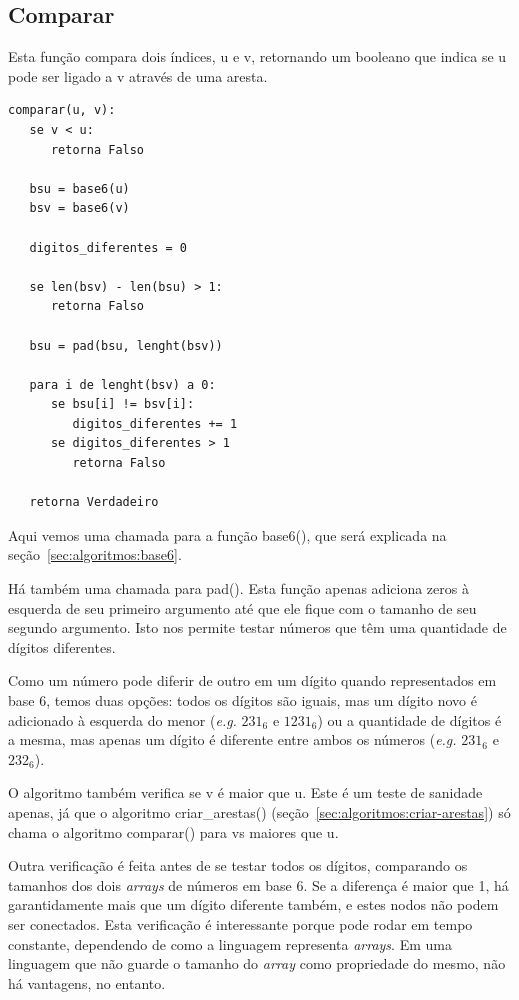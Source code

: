 \documentclass[12pt]{article}
\begin{document}
\subsection{Comparar}\label{sec:algoritmos:comparar}
Esta fun\c{c}ão compara dois índices, {\sf u} e {\sf v}, retornando um booleano que indica se {\sf u} pode ser ligado a {\sf v} através de uma aresta.
\begin{lstlisting}
comparar(u, v):
   se v < u:
      retorna Falso

   bsu = base6(u)
   bsv = base6(v)

   digitos_diferentes = 0

   se len(bsv) - len(bsu) > 1:
      retorna Falso

   bsu = pad(bsu, lenght(bsv))

   para i de lenght(bsv) a 0:
      se bsu[i] != bsv[i]:
         digitos_diferentes += 1
      se digitos_diferentes > 1
         retorna Falso

   retorna Verdadeiro
\end{lstlisting}

Aqui vemos uma chamada para a fun\c{c}ão {\sf base6()}, que será explicada na se\c{c}ão~\ref{sec:algoritmos:base6}.

Há também uma chamada para {\sf pad()}. Esta fun\c{c}ão apenas adiciona zeros à esquerda de seu primeiro argumento até que ele fique com o tamanho de seu segundo argumento. Isto nos permite testar números que têm uma quantidade de dígitos diferentes.

Como um número pode diferir de outro em um dígito quando representados em base 6, temos duas op\c{c}ões: todos os dígitos são iguais, mas um dígito novo é adicionado à esquerda do menor (\textit{e.g.} $231_6$ e $1231_6$) ou a quantidade de dígitos é a mesma, mas apenas um dígito é diferente entre ambos os números (\textit{e.g.} $231_6$ e $232_6$).

O algoritmo também verifica se {\sf v} é maior que {\sf u}. Este é um teste de sanidade apenas, já que o algoritmo {\sf criar\_arestas()} (se\c{c}ão~\ref{sec:algoritmos:criar-arestas}) só chama o algoritmo {\sf comparar()} para {\sf v}s maiores que {\sf u}.

Outra verifica\c{c}ão é feita antes de se testar todos os dígitos, comparando os tamanhos dos dois \textit{arrays} de números em base 6. Se a diferen\c{c}a é maior que 1, há garantidamente mais que um dígito diferente também, e estes nodos não podem ser conectados. Esta verifica\c{c}ão é interessante porque pode rodar em tempo constante, dependendo de como a linguagem representa \textit{arrays}. Em uma linguagem que não guarde o tamanho do \textit{array} como propriedade do mesmo, não há vantagens, no entanto.
\end{document}

